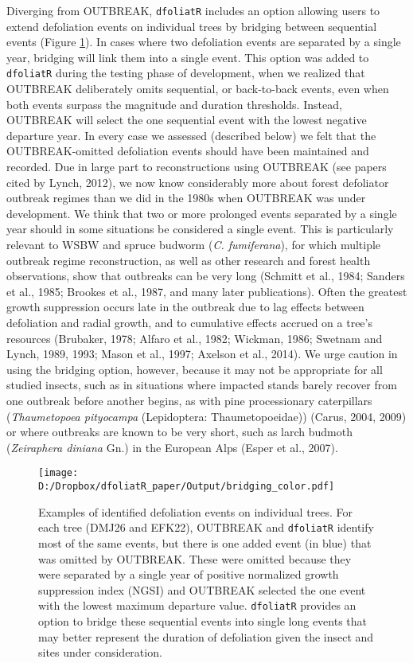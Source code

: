 \documentclass[review]{elsarticle} %
\makeatletter
\def\maxwidth{\ifdim\Gin@nat@width>\linewidth\linewidth
\else\Gin@nat@width\fi}
\let\Oldincludegraphics\includegraphics
\renewcommand{\includegraphics}[1]{\Oldincludegraphics[width=\maxwidth]{#1}}
\makeatother
\begin{document}
Diverging from OUTBREAK, \texttt{dfoliatR} includes an option allowing users to extend defoliation events on individual trees by bridging between sequential events (Figure \ref{fig:fig-bridge}). In cases where two defoliation events are separated by a single year, bridging will link them into a single event. This option was added to \texttt{dfoliatR} during the testing phase of development, when we realized that OUTBREAK deliberately omits sequential, or back-to-back events, even when both events surpass the magnitude and duration thresholds. Instead, OUTBREAK will select the one sequential event with the lowest negative departure year. In every case we assessed (described below) we felt that the OUTBREAK-omitted defoliation events should have been maintained and recorded. Due in large part to reconstructions using OUTBREAK (see papers cited by Lynch, 2012), we now know considerably more about forest defoliator outbreak regimes than we did in the 1980s when OUTBREAK was under development. We think that two or more prolonged events separated by a single year should in some situations be considered a single event. This is particularly relevant to WSBW and spruce budworm (\emph{C. fumiferana}), for which multiple outbreak regime reconstruction, as well as other research and forest health observations, show that outbreaks can be very long (Schmitt et al., 1984; Sanders et al., 1985; Brookes et al., 1987, and many later publications). Often the greatest growth suppression occurs late in the outbreak due to lag effects between defoliation and radial growth, and to cumulative effects accrued on a tree's resources (Brubaker, 1978; Alfaro et al., 1982; Wickman, 1986; Swetnam and Lynch, 1989, 1993; Mason et al., 1997; Axelson et al., 2014). We urge caution in using the bridging option, however, because it may not be appropriate for all studied insects, such as in situations where impacted stands barely recover from one outbreak before another begins, as with pine processionary caterpillars (\emph{Thaumetopoea pityocampa} (Lepidoptera: Thaumetopoeidae)) (Carus, 2004, 2009) or where outbreaks are known to be very short, such as larch budmoth (\emph{Zeiraphera diniana} Gn.) in the European Alps (Esper et al., 2007).



\begin{figure}
\centering
\texttt{[image: D:/Dropbox/dfoliatR\_paper/Output/bridging\_color.pdf]}
\caption{\label{fig:fig-bridge}Examples of identified defoliation events on individual trees. For each tree (DMJ26 and EFK22), OUTBREAK and \texttt{dfoliatR} identify most of the same events, but there is one added event (in blue) that was omitted by OUTBREAK. These were omitted because they were separated by a single year of positive normalized growth suppression index (NGSI) and OUTBREAK selected the one event with the lowest maximum departure value. \texttt{dfoliatR} provides an option to bridge these sequential events into single long events that may better represent the duration of defoliation given the insect and sites under consideration.}
\end{figure}
\end{document}
